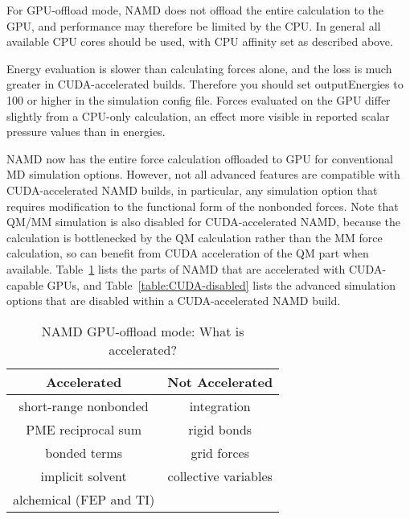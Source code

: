 For GPU-offload mode, 
NAMD does not offload the entire calculation to the GPU, and performance
may therefore be limited by the CPU.  In general all available CPU cores
should be used, with CPU affinity set as described above.

Energy evaluation is slower than calculating forces alone, and the loss
is much greater in CUDA-accelerated builds.  Therefore you should set
outputEnergies to 100 or higher in the simulation config file.
Forces evaluated on the GPU differ
slightly from a CPU-only calculation, an effect more visible in reported
scalar pressure values than in energies.

NAMD now has the entire force calculation offloaded to GPU
for conventional MD simulation options.
However,
not all advanced features are compatible with CUDA-accelerated NAMD builds,
in particular, any simulation option that requires modification
to the functional form of the nonbonded forces.
Note that QM/MM simulation is also disabled for CUDA-accelerated NAMD,
because the calculation is bottlenecked by
the QM calculation rather than the MM force calculation,
so can benefit from CUDA acceleration of the QM part when available.
Table~\ref{table:CUDA-accelerated} lists the parts of NAMD
that are accelerated with CUDA-capable GPUs,
and Table~\ref{table:CUDA-disabled} lists the advanced simulation
options that are disabled within a CUDA-accelerated NAMD build.

\begin{table}[htb]
\caption{NAMD GPU-offload mode: What is accelerated?}
\begin{center}
\begin{tabular}{c|c}
\textbf{Accelerated} & \textbf{Not Accelerated} \\ \hline
short-range nonbonded   & integration \\
PME reciprocal sum      & rigid bonds \\
bonded terms            & grid forces \\
implicit solvent        & collective variables \\
alchemical (FEP and TI) &
\end{tabular}
\end{center}
\label{table:CUDA-accelerated}
\end{table}

